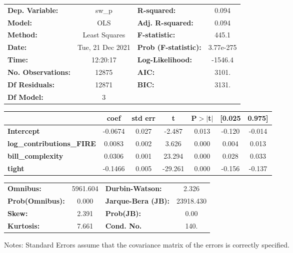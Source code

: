 \begin{center}
\begin{tabular}{lclc}
\toprule
\textbf{Dep. Variable:}           &      sw\_p       & \textbf{  R-squared:         } &     0.094   \\
\textbf{Model:}                   &       OLS        & \textbf{  Adj. R-squared:    } &     0.094   \\
\textbf{Method:}                  &  Least Squares   & \textbf{  F-statistic:       } &     445.1   \\
\textbf{Date:}                    & Tue, 21 Dec 2021 & \textbf{  Prob (F-statistic):} & 3.77e-275   \\
\textbf{Time:}                    &     12:20:17     & \textbf{  Log-Likelihood:    } &   -1546.4   \\
\textbf{No. Observations:}        &       12875      & \textbf{  AIC:               } &     3101.   \\
\textbf{Df Residuals:}            &       12871      & \textbf{  BIC:               } &     3131.   \\
\textbf{Df Model:}                &           3      & \textbf{                     } &             \\
\bottomrule
\end{tabular}
\begin{tabular}{lcccccc}
                                  & \textbf{coef} & \textbf{std err} & \textbf{t} & \textbf{P$> |$t$|$} & \textbf{[0.025} & \textbf{0.975]}  \\
\midrule
\textbf{Intercept}                &      -0.0674  &        0.027     &    -2.487  &         0.013        &       -0.120    &       -0.014     \\
\textbf{log\_contributions\_FIRE} &       0.0083  &        0.002     &     3.626  &         0.000        &        0.004    &        0.013     \\
\textbf{bill\_complexity}         &       0.0306  &        0.001     &    23.294  &         0.000        &        0.028    &        0.033     \\
\textbf{tight}                    &      -0.1466  &        0.005     &   -29.261  &         0.000        &       -0.156    &       -0.137     \\
\bottomrule
\end{tabular}
\begin{tabular}{lclc}
\textbf{Omnibus:}       & 5961.604 & \textbf{  Durbin-Watson:     } &     2.326  \\
\textbf{Prob(Omnibus):} &   0.000  & \textbf{  Jarque-Bera (JB):  } & 23918.430  \\
\textbf{Skew:}          &   2.391  & \textbf{  Prob(JB):          } &      0.00  \\
\textbf{Kurtosis:}      &   7.661  & \textbf{  Cond. No.          } &      140.  \\
\bottomrule
\end{tabular}
\end{center}

Notes: \newline
 [1] Standard Errors assume that the covariance matrix of the errors is correctly specified.